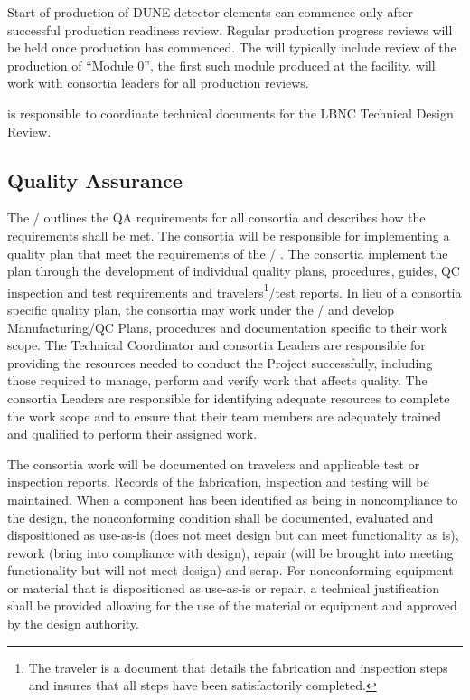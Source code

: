 Start of production of DUNE detector elements can commence only after
successful production readiness review. Regular production progress
reviews will be held once production has commenced. The 
will typically include review of the production of ``Module 0'', the
first such module produced at the facility.  will work with
consortia leaders for all production reviews.

 is responsible to coordinate technical documents for the LBNC
Technical Design Review.

\subsection{Quality Assurance}
\label{sec:fdsp-coord-qa}


The /  outlines the QA requirements
for all  consortia and describes how the requirements
shall be met. The consortia will be responsible for implementing a
quality plan that meet the requirements of the
/ .  The consortia implement the
plan through the development of individual quality plans, procedures,
guides, QC inspection and test requirements and travelers\footnote{The
  traveler is a document that details the fabrication and inspection
  steps and insures that all steps have been satisfactorily
  completed.}/test reports.  In lieu of a consortia specific quality
plan, the consortia may work under the /
 and develop Manufacturing/QC Plans, procedures and
documentation specific to their work scope.  The 
Technical Coordinator and consortia Leaders are responsible for
providing the resources needed to conduct the Project successfully,
including those required to manage, perform and verify work that
affects quality.  The  consortia Leaders are responsible
for identifying adequate resources to complete the work scope and to
ensure that their team members are adequately trained and qualified to
perform their assigned work.

The consortia work will be documented on travelers and applicable test
or inspection reports. Records of the fabrication, inspection and
testing will be maintained. When a component has been identified as
being in noncompliance to the design, the nonconforming condition
shall be documented, evaluated and dispositioned as use-as-is (does
not meet design but can meet functionality as is), rework (bring into
compliance with design), repair (will be brought into meeting
functionality but will not meet design) and scrap. For nonconforming
equipment or material that is dispositioned as use-as-is or repair, a
technical justification shall be provided allowing for the use of the
material or equipment and approved by the design authority.

